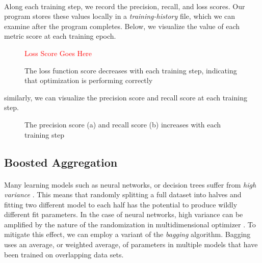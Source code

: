 \documentclass[12pt,letterpaper]{article}
\begin{document}
\paragraph*{}Along each training step, we record the precision, recall, and loss scores. Our program stores these values locally in a \textit{training-history} file, which we can examine after the program completes. Below, we visualize the value of each metric score at each training epoch. 

\begin{figure}[h]
\begin{center}
\textcolor{red}{Loss Score Goes Here}
\end{center}
\caption{The loss function score decreases with each training step, indicating that optimization is performing correctly}
\label{fig-LossScore}
\end{figure}

similarly, we can visualize the precision score and recall score at each training step.

\begin{figure}[h]
\begin{center}

\end{center}
\caption{The precision score (a) and recall score (b) increases with each training step}
\label{fig-PrecisionRecallScores}
\end{figure}


\subsection{Boosted Aggregation}
\label{subsec-Bagging}

\paragraph*{}Many learning models such as neural networks, or decision trees suffer from \textit{high variance} \cite{James}. This means that randomly splitting a full dataset into halves and fitting two different model to each half has the potential to produce wildly different fit parameters. In the case of neural networks, high variance can be amplified by the nature of the randomization in multidimensional optimizer \cite{Geron}. To mitigate this effect, we can employ a variant of the \textit{bagging} algorithm. Bagging uses an average, or weighted average, of parameters in multiple models that have been trained on overlapping data sets.
\end{document}
